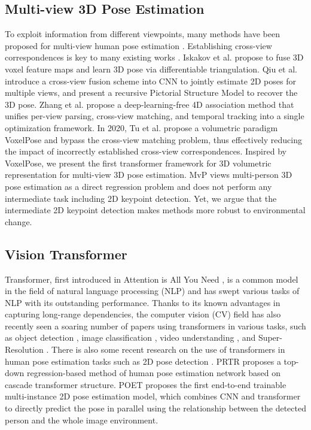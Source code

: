 \documentclass[lettersize,journal]{IEEEtran}
\begin{document}
\subsection{Multi-view 3D Pose Estimation}
To exploit information from different viewpoints, many methods have been proposed for multi-view human pose estimation
\cite{zhang2021direct,tu2020voxelpose,iskakov2019learnable,qiu2019cross,zhang20204d}. Establishing cross-view correspondences is key to many existing works \cite{iskakov2019learnable,qiu2019cross,zhang20204d}. Iskakov et al. \cite{iskakov2019learnable} propose to fuse 3D voxel feature
maps and learn 3D pose via differentiable triangulation.
Qiu et al. \cite{qiu2019cross} introduce a cross-view fusion scheme into CNN to jointly estimate 2D poses for multiple views, and present a recursive Pictorial Structure Model to recover the 3D pose. Zhang et al. \cite{zhang20204d} propose a deep-learning-free 4D association method that unifies per-view parsing, cross-view matching, and temporal tracking into a single optimization framework. In 2020, Tu et al. propose a volumetric paradigm VoxelPose \cite{tu2020voxelpose} and bypass the cross-view matching problem, thus effectively reducing the impact of incorrectly established cross-view correspondences. Inspired by VoxelPose, we present the first transformer framework for 3D volumetric representation for multi-view 3D pose estimation. MvP \cite{zhang2021direct} views multi-person 3D pose estimation as a direct regression problem and does not perform any intermediate task including 2D keypoint detection. Yet, we argue that the intermediate 2D keypoint detection makes methods more robust to environmental change. 

\subsection{Vision Transformer}

\par Transformer, first introduced in Attention is All You Need \cite{vaswani2017attention}, is a common model in the field of natural language processing (NLP) and has swept various tasks of NLP with its outstanding performance. Thanks to its known advantages in capturing long-range dependencies, the computer vision (CV) field has also recently seen a soaring number of papers using transformers in various tasks, such as object detection \cite{carion2020end, zhu2020deformable, mao2021voxel,guan2022m3detr}, image classification \cite{dosovitskiy2020image,liu2021swin, li2022bvit}, video understanding \cite{sun2019videobert, girdhar2019video, lee2020parameter, wang2021end}, and Super-Resolution \cite{yang2020learning, qiu2021nested, cai2021freqnet}. There is also some recent research on the use of transformers in human pose estimation tasks such as 2D pose detection \cite{mao2022poseur,mao2021tfpose,li2021pose,stoffl2021end}. PRTR \cite{li2021pose} proposes a top-down regression-based method of human pose estimation network based on cascade transformer structure. POET \cite{stoffl2021end} proposes the first end-to-end trainable multi-instance 2D pose estimation model, which combines CNN and transformer to directly predict the pose in parallel using the relationship between the detected person and the whole image environment. 
\end{document}

